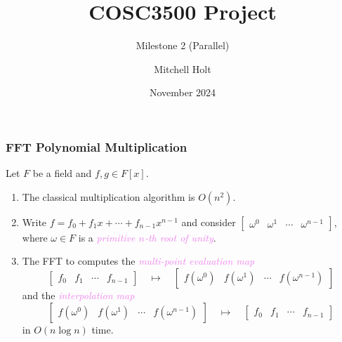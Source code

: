 \documentclass{beamer}
\title{COSC3500 Project}
\subtitle{Milestone 2 (Parallel)}
\author{Mitchell Holt}
\date{November 2024}
\newcommand{\its}[1]{\textcolor{violet}{\emph{#1}}}
\begin{document}

\begin{frame}
    \maketitle
\end{frame}

\begin{frame}
    \frametitle{FFT Polynomial Multiplication}

    Let $F$ be a field and $f,g \in F[x]$. \pause \vfill

    \begin{enumerate}[label=(\roman*)]
        \item The classical multiplication algorithm is $O(n^2)$. \pause
            \medbreak

        \item Write $f = f_0 + f_1x + \cdots + f_{n - 1} x^{n - 1}$ and consider
            $\begin{bmatrix} \omega^0 & \omega^1 & \cdots & \omega^{n - 1}
            \end{bmatrix}$, where $\omega \in F$ is a \its{primitive $n$-th root
            of unity}. \pause \medbreak

        \item The FFT to computes the \its{multi-point evaluation map}
            $$
                \begin{bmatrix} f_0 & f_1 & \cdots & f_{n - 1} \end{bmatrix}
                \quad \mapsto \quad \begin{bmatrix}
                    f(\omega^0) & f(\omega^1) & \cdots & f(\omega^{n - 1})
                \end{bmatrix}
            $$
            and the \its{interpolation map}
            $$
                \begin{bmatrix}
                    f(\omega^0) & f(\omega^1) & \cdots & f(\omega^{n - 1})
                \end{bmatrix}
                \quad \mapsto \quad
                \begin{bmatrix} f_0 & f_1 & \cdots & f_{n - 1} \end{bmatrix}
            $$
            in $O(n\log n)$ time.
    \end{enumerate}
\end{frame}
\end{document}

